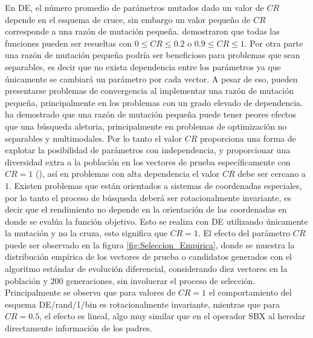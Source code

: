 En DE, el número promedio de parámetros mutados dado un valor de $CR$ depende en el esquema de cruce, sin embargo un valor pequeño de $CR$ corresponde a una razón de mutación pequeña.
%
\cite{storn1997differential} demostraron que todas las funciones pueden ser resueltas con $0 \leq CR \leq 0.2$ o $0.9 \leq CR \leq 1$.
%
Por otra parte una razón de mutación pequeña podría ser beneficioso para problemas que sean separables, es decir que no exista dependencia entre los parámetros ya que únicamente se cambiará un parámetro por cada vector.
%
A pesar de eso, pueden presentarse problemas de convergencia al implementar una razón de mutación pequeña, principalmente en los problemas con un grado elevado de dependencia.
%
\cite{salomon1996re} ha demostrado que una razón de mutación pequeña puede tener peores efectos que una búsqueda aletoria, principalmente en problemas de optimización no separables y multimodales.
%
Por lo tanto el valor $CR$ proporciona una forma de explotar la posibilidad de parámetros con independencia, y proporcionar una diversidad extra a la población en los vectores de prueba específicamente con $CR=1$ (\cite{price2006differential}), así en problemas con alta dependencia el valor $CR$ debe ser cercano a $1$.
%
Existen problemas que están orientados a sistemas de coordenadas especiales, por lo tanto el proceso de búsqueda deberá ser rotacionalmente invariante, es decir que el rendimiento no depende en la orientación de las coordenadas en donde se evalúa la función objetivo.
%
Esto se realiza con DE utilizando únicamente la mutación y no la cruza, esto significa que $CR=1$.
%
El efecto del parámetro $CR$ puede ser observado en la figura \ref{fig:Seleccion_Empirica}, donde se muestra la distribución empírica de los vectores de prueba o candidatos generados con el algoritmo estándar de evolución diferencial, considerando diez vectores en la población y $200$ generaciones, sin involucrar el proceso de selección.
%
Principalmente se observa que para valores de $CR=1$ el comportamiento del esquema DE/rand/1/bin es rotacionalmente invariante, mientras que para $CR=0.5$, el efecto es lineal, algo muy similar que en el operador SBX al heredar directamente información de los padres.

